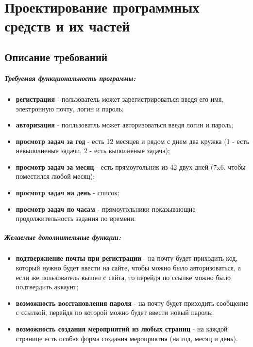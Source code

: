\newpage
\section{Проектирование программных средств и их частей}

\subsection{Описание требований}

\subparagraph{Требуемая функциональность программы:}\hspace{0pt}

\begin{itemize}
  \item \textbf{регистрация} - пользователь может зарегистрироваться введя его имя, электронную почту, логин и пароль;
  \item \textbf{авторизация} - полльзоватль может авторизоваться введя логин и пароль;
  \item \textbf{просмотр задач за год} - есть 12 месяцев и рядом с днем два кружка (1 - есть невыполненые задачи, 2 - есть выполненые задача);
  \item \textbf{просмотр задач за месяц} - есть прямоугольник из 42 двух дней (7x6, чтобы поместился любой месяц);
  \item \textbf{просмотр задач на день} - список;
  \item \textbf{просмотр задач по часам} - прямоугольники показывающие продолжительность задания по времени.
\end{itemize}

\subparagraph{Желаемые дополнительные функции:}\hspace{0pt}

\begin{itemize}
  \item \textbf{подтвержнение почты при регистрации} - на почту будет приходить код, который нужно будет ввести на сайте,
  чтобы можно было авторизоваться, а если же пользователь вышел с сайта,
  то перейдя по ссылке можно было подтвердить аккаунт;
  \item \textbf{возможность восстановления пароля} - на почту будет приходить сообщение с ссылкой,
  перейдя по которой можно будет ввести новый пароль;
  \item \textbf{возможность создания мероприятий из любых страниц} - на каждой странице есть особая форма создания мероприятия
  (на год, месяц и день).
\end{itemize}

